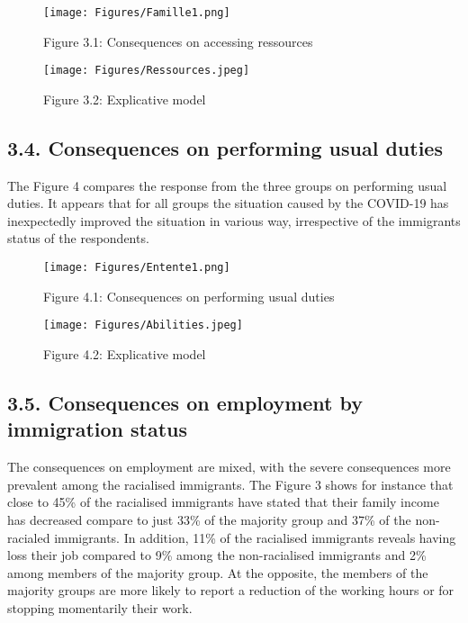 \documentclass[
]{article}
\begin{document}
\begin{figure}
\centering
\texttt{[image: Figures/Famille1.png]}
\caption{Figure 3.1: Consequences on accessing
ressources}
\end{figure}

\begin{figure}
\centering
\texttt{[image: Figures/Ressources.jpeg]}
\caption{Figure 3.2: Explicative model}
\end{figure}

\hypertarget{consequences-on-performing-usual-duties}{%
\subsection{3.4. Consequences on performing usual duties}\label{consequences-on-performing-usual-duties}}

The Figure 4 compares the response from the three groups on performing usual
duties. It appears that for all groups the situation caused by the COVID-19 has
inexpectedly improved the situation in various way, irrespective of the
immigrants status of the respondents.

\begin{figure}
\centering
\texttt{[image: Figures/Entente1.png]}
\caption{Figure 4.1: Consequences on performing usual duties}
\end{figure}

\begin{figure}
\centering
\texttt{[image: Figures/Abilities.jpeg]}
\caption{Figure 4.2: Explicative model}
\end{figure}

\hypertarget{consequences-on-employment-by-immigration-status}{%
\subsection{3.5. Consequences on employment by immigration status}\label{consequences-on-employment-by-immigration-status}}

The consequences on employment are mixed, with the severe consequences more
prevalent among the racialised immigrants. The Figure 3 shows for instance that
close to 45\% of the racialised immigrants have stated that their family income
has decreased compare to just 33\% of the majority group and 37\% of the
non-racialed immigrants. In addition, 11\% of the racialised immigrants reveals
having loss their job compared to 9\% among the non-racialised immigrants and 2\%
among members of the majority group. At the opposite, the members of the
majority groups are more likely to report a reduction of the working hours or
for stopping momentarily their work.
\end{document}
